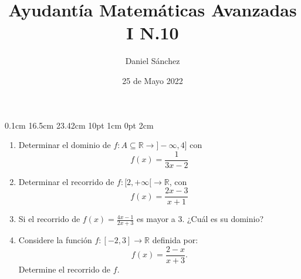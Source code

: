 \documentclass[12pt]{article}
\newcommand{\D}{\displaystyle}
\begin{document}
\setmargins{2.5cm}
{0.1cm}
{16.5cm}
{23.42cm}
{10pt}
{1cm}
{0pt}
{2cm}

\title{Ayudant\'ia Matem\'aticas Avanzadas I N.10}
\date{25 de Mayo 2022}
\author{Daniel S\'anchez}
\maketitle

\begin{enumerate}
	\item Determinar el dominio de $f: A \subseteq \mathbb{R} \rightarrow ]-\infty,4]$ con $$f(x)=\frac{1}{3x-2}$$
	\item Determinar el recorrido de $f:[2, +\infty[ \rightarrow \mathbb{R}$, con $$f(x)=\frac{2x-3}{x+1}$$
	\item Si el recorrido de $\D f(x)=\frac{4x-1}{2x+3}$ es mayor a 3. ¿Cuál es su dominio?
	\item Considere la función $f: [-2,3] \rightarrow \mathbb{R}$ definida por: $$f(x)=\frac{2-x}{x+3}.$$ Determine el recorrido de $f$.
\end{enumerate}
\end{document}

